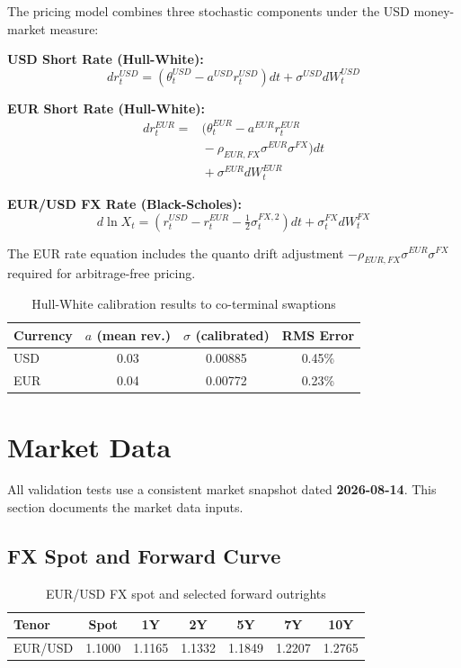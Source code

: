 \documentclass[conference]{IEEEtran}
\begin{document}
The pricing model combines three stochastic components under the USD money-market measure:

\textbf{USD Short Rate (Hull-White):}
\[dr_t^{USD} = (\theta_t^{USD} - a^{USD} r_t^{USD})dt + \sigma^{USD} dW_t^{USD}\]

\textbf{EUR Short Rate (Hull-White):}
\[
\begin{aligned}
dr_t^{EUR} ={}& (\theta_t^{EUR} - a^{EUR} r_t^{EUR} \\
               &{}- \rho_{EUR,FX}\sigma^{EUR}\sigma^{FX})dt \\
               &{}+ \sigma^{EUR} dW_t^{EUR}
\end{aligned}
\]

\textbf{EUR/USD FX Rate (Black-Scholes):}
\[d\ln X_t = (r_t^{USD} - r_t^{EUR} - \tfrac{1}{2}\sigma_t^{FX,2})dt + \sigma_t^{FX} dW_t^{FX}\]

The EUR rate equation includes the quanto drift adjustment $-\rho_{EUR,FX}\sigma^{EUR}\sigma^{FX}$ required for arbitrage-free pricing.

\begin{table}[H]
\centering
\begin{tabular}{lccc}
\toprule
\textbf{Currency} & $a$ (mean rev.) & $\sigma$ (calibrated) & RMS Error \\
\midrule
USD & 0.03 & 0.00885 & 0.45\% \\
EUR & 0.04 & 0.00772 & 0.23\% \\
\bottomrule
\end{tabular}
\caption{Hull-White calibration results to co-terminal swaptions}
\end{table}

\section{Market Data}

All validation tests use a consistent market snapshot dated \textbf{2026-08-14}. This section documents the market data inputs.

\subsection{FX Spot and Forward Curve}

\begin{table}[H]
\centering
\begin{tabular}{lcccccc}
\toprule
\textbf{Tenor} & Spot & 1Y & 2Y & 5Y & 7Y & 10Y \\
\midrule
EUR/USD & 1.1000 & 1.1165 & 1.1332 & 1.1849 & 1.2207 & 1.2765 \\
\bottomrule
\end{tabular}
\caption{EUR/USD FX spot and selected forward outrights}
\end{table}
\end{document}
